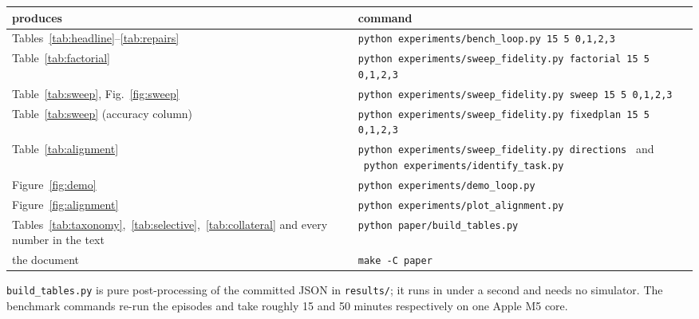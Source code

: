 \documentclass[11pt,a4paper]{article}
\begin{document}
\begin{table}[h]
\centering
\small
\begin{tabular}{@{}p{4.7cm}p{9.2cm}@{}}
\toprule
produces & command \\
\midrule
Tables~\ref{tab:headline}--\ref{tab:repairs} & \texttt{python experiments/bench\_loop.py 15 5 0,1,2,3} \\
Table~\ref{tab:factorial} & \texttt{python experiments/sweep\_fidelity.py factorial 15 5 0,1,2,3} \\
Table~\ref{tab:sweep}, Fig.~\ref{fig:sweep} & \texttt{python experiments/sweep\_fidelity.py sweep 15 5 0,1,2,3} \\
Table~\ref{tab:sweep} (accuracy column) & \texttt{python experiments/sweep\_fidelity.py fixedplan 15 5 0,1,2,3} \\
Table~\ref{tab:alignment} & \texttt{python experiments/sweep\_fidelity.py directions} \ and \ \texttt{python experiments/identify\_task.py} \\
Figure~\ref{fig:demo} & \texttt{python experiments/demo\_loop.py} \\
Figure~\ref{fig:alignment} & \texttt{python experiments/plot\_alignment.py} \\
Tables~\ref{tab:taxonomy},~\ref{tab:selective},~\ref{tab:collateral} and every number in the text & \texttt{python paper/build\_tables.py} \\
the document & \texttt{make -C paper} \\
\bottomrule
\end{tabular}
\end{table}

\noindent
\texttt{build\_tables.py} is pure post-processing of the committed JSON in
\texttt{results/}; it runs in under a second and needs no simulator. The
benchmark commands re-run the episodes and take roughly 15 and 50 minutes
respectively on one Apple M5 core.


\end{document}
